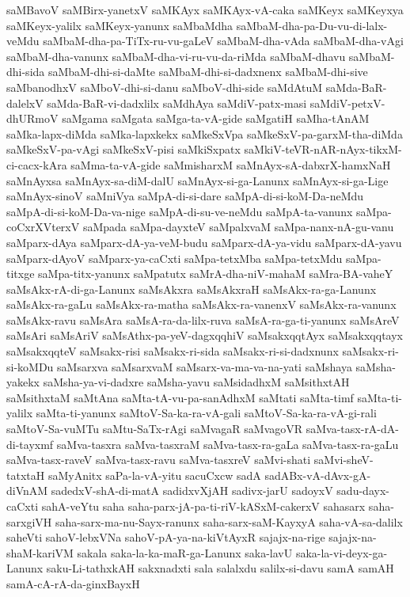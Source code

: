 {saMBavoV
saMBirx-yanetxV
saMKAyx
saMKAyx-vA-caka
saMKeyx
saMKeyxya
saMKeyx-yalilx
saMKeyx-yanunx
saMbaMdha
saMbaM-dha-pa-Du-vu-di-lalx-veMdu
saMbaM-dha-pa-TiTx-ru-vu-gaLeV
saMbaM-dha-vAda
saMbaM-dha-vAgi
saMbaM-dha-vanunx
saMbaM-dha-vi-ru-vu-da-riMda
saMbaM-dhavu
saMbaM-dhi-sida
saMbaM-dhi-si-daMte
saMbaM-dhi-si-dadxnenx
saMbaM-dhi-sive
saMbanodhxV
saMboV-dhi-si-danu
saMboV-dhi-side
saMdAtuM
saMda-BaR-dalelxV
saMda-BaR-vi-dadxlilx
saMdhAya
saMdiV-patx-masi
saMdiV-petxV-dhURmoV
saMgama
saMgata
saMga-ta-vA-gide
saMgatiH
saMha-tAnAM
saMka-lapx-diMda
saMka-lapxkekx
saMkeSxVpa
saMkeSxV-pa-garxM-tha-diMda
saMkeSxV-pa-vAgi
saMkeSxV-pisi
saMkiSxpatx
saMkiV-teVR-nAR-nAyx-tikxM-ci-cacx-kAra
saMma-ta-vA-gide
saMmisharxM
saMnAyx-sA-dabxrX-hamxNaH
saMnAyxsa
saMnAyx-sa-diM-dalU
saMnAyx-si-ga-Lanunx
saMnAyx-si-ga-Lige
saMnAyx-sinoV
saMniVya
saMpA-di-si-dare
saMpA-di-si-koM-Da-neMdu
saMpA-di-si-koM-Da-va-nige
saMpA-di-su-ve-neMdu
saMpA-ta-vanunx
saMpa-coCxrXVterxV
saMpada
saMpa-dayxteV
saMpalxvaM
saMpa-nanx-nA-gu-vanu
saMparx-dAya
saMparx-dA-ya-veM-budu
saMparx-dA-ya-vidu
saMparx-dA-yavu
saMparx-dAyoV
saMparx-ya-caCxti
saMpa-tetxMba
saMpa-tetxMdu
saMpa-titxge
saMpa-titx-yanunx
saMpatutx
saMrA-dha-niV-mahaM
saMra-BA-vaheY
saMsAkx-rA-di-ga-Lanunx
saMsAkxra
saMsAkxraH
saMsAkx-ra-ga-Lanunx
saMsAkx-ra-gaLu
saMsAkx-ra-matha
saMsAkx-ra-vanenxV
saMsAkx-ra-vanunx
saMsAkx-ravu
saMsAra
saMsA-ra-da-lilx-ruva
saMsA-ra-ga-ti-yanunx
saMsAreV
saMsAri
saMsAriV
saMsAthx-pa-yeV-dagxqqhiV
saMsakxqqtAyx
saMsakxqqtayx
saMsakxqqteV
saMsakx-risi
saMsakx-ri-sida
saMsakx-ri-si-dadxnunx
saMsakx-ri-si-koMDu
saMsarxva
saMsarxvaM
saMsarx-va-ma-va-na-yati
saMshaya
saMsha-yakekx
saMsha-ya-vi-dadxre
saMsha-yavu
saMsidadhxM
saMsithxtAH
saMsithxtaM
saMtAna
saMta-tA-vu-pa-sanAdhxM
saMtati
saMta-timf
saMta-ti-yalilx
saMta-ti-yanunx
saMtoV-Sa-ka-ra-vA-gali
saMtoV-Sa-ka-ra-vA-gi-rali
saMtoV-Sa-vuMTu
saMtu-SaTx-rAgi
saMvagaR
saMvagoVR
saMva-tasx-rA-dA-di-tayxmf
saMva-tasxra
saMva-tasxraM
saMva-tasx-ra-gaLa
saMva-tasx-ra-gaLu
saMva-tasx-raveV
saMva-tasx-ravu
saMva-tasxreV
saMvi-shati
saMvi-sheV-tatxtaH
saMyAnitx
saPa-la-vA-yitu
sacuCxcw
sadA
sadABx-vA-dAvx-gA-diVnAM
sadedxV-shA-di-matA
sadidxvXjAH
sadivx-jarU
sadoyxV
sadu-dayx-caCxti
sahA-veYtu
saha
saha-parx-jA-pa-ti-riV-kASxM-cakerxV
sahasarx
saha-sarxgiVH
saha-sarx-ma-nu-Sayx-ranunx
saha-sarx-saM-KayxyA
saha-vA-sa-dalilx
saheVti
sahoV-lebxVNa
sahoV-pA-ya-na-kiVtAyxR
sajajx-na-rige
sajajx-na-shaM-kariVM
sakala
saka-la-ka-maR-ga-Lanunx
saka-lavU
saka-la-vi-deyx-ga-Lanunx
saku-Li-tathxkAH
sakxnadxti
sala
salalxdu
salilx-si-davu
samA
samAH
samA-cA-rA-da-ginxBayxH
}
